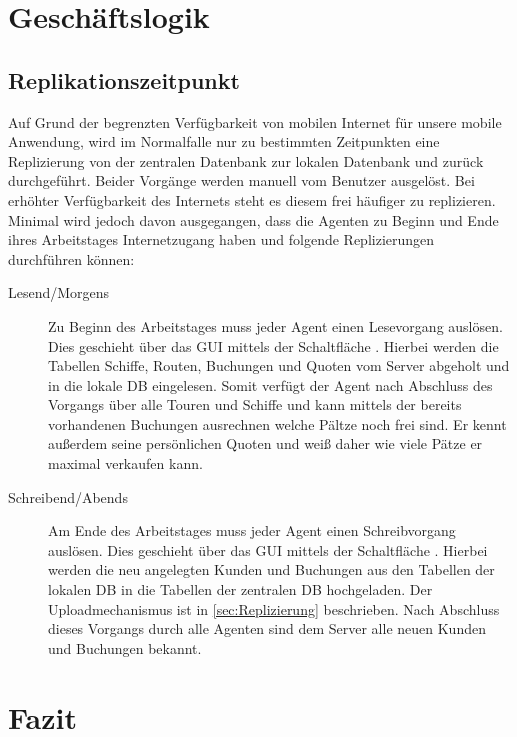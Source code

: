 \documentclass[12pt,a4paper,ngerman,english]{report}
\begin{document}
\chapter{Geschäftslogik}

\section{Replikationszeitpunkt}

Auf Grund der begrenzten Verfügbarkeit von mobilen Internet für unsere mobile Anwendung, wird im Normalfalle nur zu bestimmten Zeitpunkten eine Replizierung von der zentralen Datenbank zur lokalen Datenbank und zurück durchgeführt. Beider Vorgänge werden manuell vom Benutzer ausgelöst. Bei erhöhter Verfügbarkeit des Internets steht es diesem frei häufiger zu replizieren. Minimal wird jedoch davon ausgegangen, dass die Agenten zu Beginn und Ende ihres Arbeitstages Internetzugang haben und folgende Replizierungen durchführen können:

\begin{description}
\item[Lesend/Morgens] Zu Beginn des Arbeitstages muss jeder Agent einen Lesevorgang auslösen. Dies geschieht über das GUI mittels der Schaltfläche . Hierbei werden die Tabellen Schiffe, Routen, Buchungen und Quoten  vom Server abgeholt und in die lokale DB eingelesen. Somit verfügt der Agent nach Abschluss des Vorgangs über alle Touren und Schiffe und kann mittels der bereits vorhandenen Buchungen ausrechnen welche Pältze noch frei sind. Er kennt außerdem seine persönlichen Quoten und weiß daher wie viele Pätze er maximal verkaufen kann.
\item[Schreibend/Abends] Am Ende des Arbeitstages muss jeder Agent einen Schreibvorgang auslösen. Dies geschieht über das GUI mittels der Schaltfläche . Hierbei werden die neu angelegten Kunden und Buchungen aus den Tabellen  der lokalen DB in die Tabellen  der zentralen DB hochgeladen. Der Uploadmechanismus ist in \autoref{sec:Replizierung} beschrieben. Nach Abschluss dieses Vorgangs durch alle Agenten sind dem Server alle neuen Kunden und Buchungen bekannt. 
\end{description}

\chapter{Fazit}


{}

\end{document}
